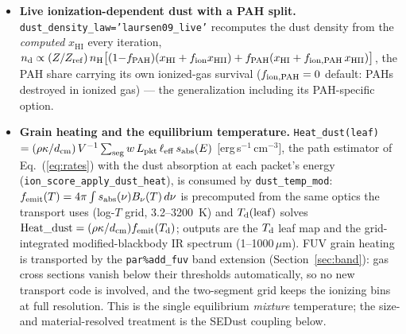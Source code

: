 \documentclass[english,a4paper]{my_memo}
\newcommand{\code}[1]{\texttt{#1}}
\newcommand{\xHI}{x_{\mathrm{HI}}}
\begin{document}
\begin{itemize}
  normally zero), and the absorbed luminosity
  $\code{L\_ABS} = \code{L\_EMIT} - \code{L\_ESC} - \code{L\_LOST}$.  The
  albedo weight removes the absorbed share at each interaction and
  Russian roulette preserves the expectation, so \code{L\_ABS} equals the
  absorbed power in expectation; with \code{absorption\_ledger} the log
  compares it with the absorbed power of the path estimators.
\item \textbf{Live ionization-dependent dust with a PAH split.}
  \code{dust\_density\_law='laursen09\_live'} recomputes the dust density from
  the \emph{computed} $\xHI$ every iteration,
  $n_{\rm d} \propto (Z/Z_{\rm ref})\,n_{\rm H}\big[(1{-}f_{\rm PAH})
  (\xHI + f_{\rm ion}x_{\rm HII}) + f_{\rm PAH}(\xHI +
  f_{\rm ion,PAH}\,x_{\rm HII})\big]$, the PAH share carrying its own
  ionized-gas survival ($f_{\rm ion,PAH} = 0$ default: PAHs destroyed
  in ionized gas) --- the generalization including its
  PAH-specific option.
\item \textbf{Grain heating and the equilibrium temperature.}
  \code{Heat\_dust(leaf)} $= (\rho\kappa/d_{\rm cm})\,V^{-1}\sum_{\rm seg}
  w\,L_{\rm pkt}\,\ell_{\rm eff}\,s_{\rm abs}(E)$ [erg\,s$^{-1}$\,cm$^{-3}$],
  the path estimator of Eq.~(\ref{eq:rates}) with the dust absorption at each
  packet's energy (\code{ion\_score\_\allowbreak apply\_dust\_heat}), is consumed by
  \code{dust\_temp\_mod}: $f_{\rm emit}(T) = 4\pi\int s_{\rm abs}(\nu)
  B_\nu(T)\,d\nu$ is precomputed from the same optics the transport uses (log-$T$
  grid, 3.2--3200~K) and $T_{\rm d}({\rm leaf})$ solves
  ${\rm Heat\_dust} = (\rho\kappa/d_{\rm cm})f_{\rm emit}(T_{\rm d})$;
  outputs are the $T_{\rm d}$ leaf map and the grid-integrated
  modified-blackbody IR spectrum (1--1000\,$\mu$m).  FUV grain heating
  is transported by the \code{par\%add\_fuv} band extension
  (Section~\ref{sec:band}): gas cross sections vanish below their thresholds automatically,
  so no new transport code is involved, and the two-segment grid keeps
  the ionizing bins at full resolution.  This is the
  single equilibrium \emph{mixture} temperature; the size- and
  material-resolved treatment is the SEDust coupling below.
\end{itemize}
\end{document}
